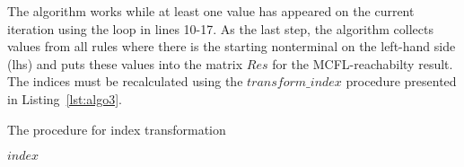 The algorithm works while at least one value has appeared on the current iteration using the loop in lines 10-17. As the last step, the algorithm collects values from all rules where there is the starting nonterminal on the left-hand side (lhs) and puts these values into the matrix $Res$ for the MCFL-reachabilty result. The indices must be recalculated using the $transform\_index$ procedure presented in Listing~\ref{lst:algo3}.

\begin{algorithm}[H]
\footnotesize
\begin{algorithmic}[1]
\caption{The procedure for index transformation}
\label{lst:algo3}

                     
                \Else
                 
                \EndIf
                
                     
                \Else
                 
                \EndIf
            \EndFor
    \Return $index$
\EndProcedure

\end{algorithmic}
\end{algorithm}





